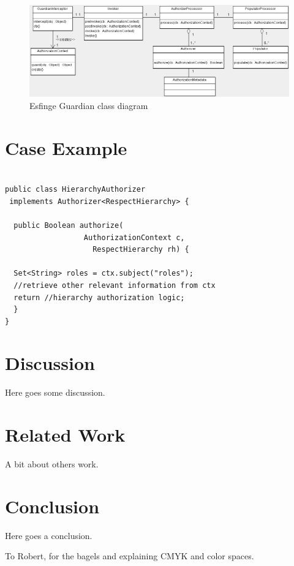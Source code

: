 \documentclass[sigconf]{acmart}
\begin{document}
\begin{figure}
  \centering
  \includegraphics[scale=0.45]{img/guardian-class-diagram.png}
  \caption{Esfinge Guardian class diagram \cite{Silva2013}}
  \label{fig:guardian-class-diagram}
\end{figure}



\section{Case Example}

\begin{lstlisting}

public class HierarchyAuthorizer
 implements Authorizer<RespectHierarchy> {

  public Boolean authorize(
                  AuthorizationContext c,
                    RespectHierarchy rh) {

  Set<String> roles = ctx.subject("roles");
  //retrieve other relevant information from ctx
  return //hierarchy authorization logic;
  }
}

\end{lstlisting}

\section{Discussion}

Here goes some discussion.

\section{Related Work}
A bit about others work.


\section{Conclusion}
Here goes a conclusion.
%
\begin{acks}
To Robert, for the bagels and explaining CMYK and color spaces.
\end{acks}

%


\end{document}
